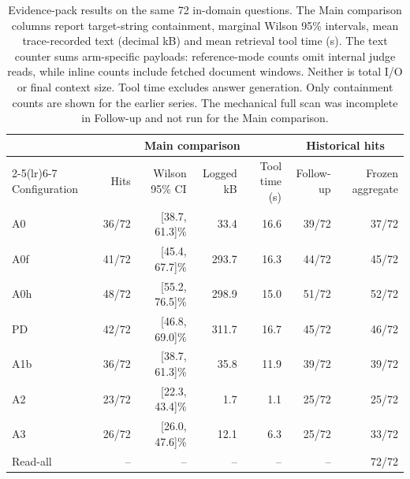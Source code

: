 \begin{table}[t]
\centering\small
\caption{Evidence-pack results on the same 72 in-domain questions. The
Main comparison columns report target-string containment, marginal Wilson 95\%
intervals, mean trace-recorded text (decimal kB) and mean retrieval tool time
(s). The text counter sums arm-specific payloads: reference-mode counts omit
internal judge reads, while inline counts include fetched document windows.
Neither is total I/O or final context size. Tool time excludes answer
generation. Only containment counts are shown for the earlier series.
The mechanical full scan was incomplete in Follow-up and not run for the
Main comparison.}
\label{tab:s-arm-data}
\begin{tabular}{lrrrrrr}
\toprule
& \multicolumn{4}{c}{Main comparison} & \multicolumn{2}{c}{Historical hits} \\
\cmidrule(lr){2-5}\cmidrule(lr){6-7}
Configuration & Hits & Wilson 95\% CI & Logged kB & Tool time (s) & Follow-up & Frozen aggregate \\
\midrule
A0 & 36/72 & [38.7, 61.3]\% & 33.4 & 16.6 & 39/72 & 37/72 \\
A0f & 41/72 & [45.4, 67.7]\% & 293.7 & 16.3 & 44/72 & 45/72 \\
A0h & 48/72 & [55.2, 76.5]\% & 298.9 & 15.0 & 51/72 & 52/72 \\
PD & 42/72 & [46.8, 69.0]\% & 311.7 & 16.7 & 45/72 & 46/72 \\
A1b & 36/72 & [38.7, 61.3]\% & 35.8 & 11.9 & 39/72 & 39/72 \\
A2 & 23/72 & [22.3, 43.4]\% & 1.7 & 1.1 & 25/72 & 25/72 \\
A3 & 26/72 & [26.0, 47.6]\% & 12.1 & 6.3 & 25/72 & 33/72 \\
Read-all & -- & -- & -- & -- & -- & 72/72 \\
\bottomrule
\end{tabular}
\end{table}
